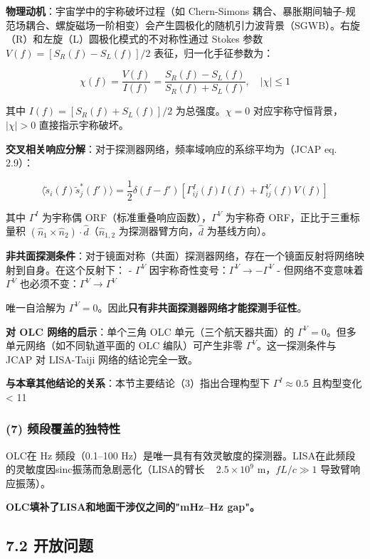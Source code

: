 \documentclass[12pt,a4paper]{article}
\begin{document}
\textbf{物理动机}：宇宙学中的宇称破坏过程（如 Chern-Simons 耦合、暴胀期间轴子-规范场耦合、螺旋磁场一阶相变）会产生圆极化的随机引力波背景（SGWB）。右旋（R）和左旋（L）圆极化模式的不对称性通过 Stokes 参数 $V(f) = [S_R(f) - S_L(f)]/2$ 表征，归一化手征参数为：

$$\chi(f) = \frac{V(f)}{I(f)} = \frac{S_R(f) - S_L(f)}{S_R(f) + S_L(f)}, \quad |\chi| \leq 1$$

其中 $I(f) = [S_R(f) + S_L(f)]/2$ 为总强度。$\chi = 0$ 对应宇称守恒背景，$|\chi| > 0$ 直接指示宇称破坏。

\textbf{交叉相关响应分解}：对于探测器网络，频率域响应的系综平均为（JCAP eq. 2.9）：

$$\langle \tilde{s}_i(f) \tilde{s}_j^*(f') \rangle = \frac{1}{2} \delta(f - f') \left[ \Gamma^I_{ij}(f) I(f) + \Gamma^V_{ij}(f) V(f) \right]$$

其中 $\Gamma^I$ 为宇称偶 ORF（标准重叠响应函数），$\Gamma^V$ 为宇称奇 ORF，正比于三重标量积 $(\hat{n}_1 \times \hat{n}_2) \cdot \hat{d}$（$\hat{n}_{1,2}$ 为探测器臂方向，$\hat{d}$ 为基线方向）。

\textbf{非共面探测条件}：对于镜面对称（共面）探测器网络，存在一个镜面反射将网络映射到自身。在这个反射下：
- $\Gamma^V$ 因宇称奇性变号：$\Gamma^V \to -\Gamma^V$
- 但网络不变意味着 $\Gamma^V$ 也必须不变：$\Gamma^V \to \Gamma^V$

唯一自洽解为 $\Gamma^V = 0$。因此\textbf{只有非共面探测器网络才能探测手征性}。

\textbf{对 OLC 网络的启示}：单个三角 OLC 单元（三个航天器共面）的 $\Gamma^V = 0$。但多单元网络（如不同轨道平面的 OLC 编队）可产生非零 $\Gamma^V$。这一探测条件与 JCAP 对 LISA-Taiji 网络的结论完全一致。

\textbf{与本章其他结论的关系}：本节主要结论（3）指出合理构型下 $\Gamma^I \approx 0.5$ 且构型变化 < 11%

\subsubsection{(7) 频段覆盖的独特性}


OLC在 Hz 频段（0.1–100 Hz）是唯一具有有效灵敏度的探测器。LISA在此频段的灵敏度因sinc振荡而急剧恶化（LISA的臂长 ~ $2.5 \times 10^9$ m，$fL/c \gg 1$ 导致臂响应振荡）。

\textbf{OLC填补了LISA和地面干涉仪之间的"mHz–Hz gap"。}

\subsection{7.2 开放问题}
\end{document}
